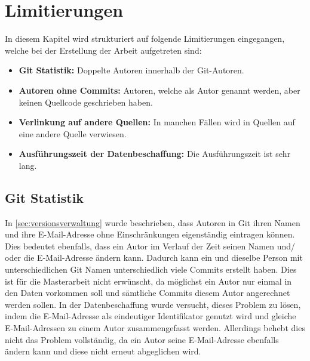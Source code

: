 \section{Limitierungen}
\label{sec:limitierungen}
In diesem Kapitel wird strukturiert auf folgende Limitierungen eingegangen, welche bei der Erstellung der Arbeit aufgetreten sind:
\begin{itemize}
    \item \textbf{Git Statistik:} Doppelte Autoren innerhalb der Git-Autoren.
    \item \textbf{Autoren ohne Commits:} Autoren, welche als Autor genannt werden, aber keinen Quellcode geschrieben haben.
    \item \textbf{Verlinkung auf andere Quellen:} In manchen Fällen wird in Quellen auf eine andere Quelle verwiesen.
    \item \textbf{Ausführungszeit der Datenbeschaffung:} Die Ausführungszeit ist sehr lang.
\end{itemize}

\subsection*{Git Statistik}
\label{sec:git_statistik}
In \autoref{sec:versionsverwaltung} wurde beschrieben, dass Autoren in Git ihren Namen und ihre E-Mail-Adresse ohne Einschränkungen eigenständig eintragen können.
Dies bedeutet ebenfalls, dass ein Autor im Verlauf der Zeit seinen Namen und/ oder die E-Mail-Adresse ändern kann.
Dadurch kann ein und dieselbe Person mit unterschiedlichen Git Namen unterschiedlich viele Commits erstellt haben.
Dies ist für die Masterarbeit nicht erwünscht, da möglichst ein Autor nur einmal in den Daten vorkommen soll und sämtliche Commits diesem Autor angerechnet werden sollen.
In der Datenbeschaffung wurde versucht, dieses Problem zu lösen, indem die E-Mail-Adresse als eindeutiger Identifikator genutzt wird und gleiche E-Mail-Adressen zu einem Autor zusammengefasst werden.
Allerdings behebt dies nicht das Problem vollständig, da ein Autor seine E-Mail-Adresse ebenfalls ändern kann und diese nicht erneut abgeglichen wird.

